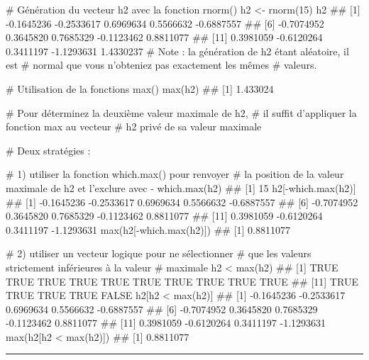 \documentclass[12pt,twosided, notitlepage]{book}
\newenvironment{Shaded}{}{}
\newcommand{\CommentTok}[1]{\textcolor[rgb]{0.00,0.50,0.00}{#1}}
\newcommand{\DecValTok}[1]{#1}
\newcommand{\KeywordTok}[1]{\textcolor[rgb]{0.00,0.00,1.00}{#1}}
\newcommand{\NormalTok}[1]{#1}
\newcommand{\OperatorTok}[1]{#1}
\newcommand{\StringTok}[1]{\textcolor[rgb]{0.00,0.50,0.50}{#1}}
\renewenvironment{Shaded}{\begin{snugshade}}{\end{snugshade}}
\begin{document}
\begin{enumerate}
\begin{Shaded}
\begin{Highlighting}[]
\CommentTok{# Génération du vecteur h2 avec la fonction rnorm()}
\NormalTok{h2 <-}\StringTok{ }\KeywordTok{rnorm}\NormalTok{(}\DecValTok{15}\NormalTok{)}
\NormalTok{h2}
\NormalTok{  ##  [1] -0.1645236 -0.2533617  0.6969634  0.5566632 -0.6887557}
\NormalTok{  ##  [6] -0.7074952  0.3645820  0.7685329 -0.1123462  0.8811077}
\NormalTok{  ## [11]  0.3981059 -0.6120264  0.3411197 -1.1293631  1.4330237}
\CommentTok{# Note : la génération de h2 étant aléatoire, il est}
\CommentTok{# normal que vous n'obteniez pas exactement les mêmes}
\CommentTok{# valeurs. }

\CommentTok{# Utilisation de la fonctions max()}
\KeywordTok{max}\NormalTok{(h2)}
\NormalTok{  ## [1] 1.433024}

\CommentTok{# Pour déterminez la deuxième valeur maximale de h2,}
\CommentTok{# il suffit d'appliquer la fonction max au vecteur}
\CommentTok{# h2 privé de sa valeur maximale}

\CommentTok{# Deux stratégies : }

\CommentTok{# 1) utiliser la fonction which.max() pour renvoyer }
\CommentTok{# la position de la valeur maximale de h2 et l'exclure avec -}
\KeywordTok{which.max}\NormalTok{(h2)}
\NormalTok{  ## [1] 15}
\NormalTok{h2[}\OperatorTok{-}\KeywordTok{which.max}\NormalTok{(h2)]}
\NormalTok{  ##  [1] -0.1645236 -0.2533617  0.6969634  0.5566632 -0.6887557}
\NormalTok{  ##  [6] -0.7074952  0.3645820  0.7685329 -0.1123462  0.8811077}
\NormalTok{  ## [11]  0.3981059 -0.6120264  0.3411197 -1.1293631}
\KeywordTok{max}\NormalTok{(h2[}\OperatorTok{-}\KeywordTok{which.max}\NormalTok{(h2)])}
\NormalTok{  ## [1] 0.8811077}

\CommentTok{# 2) utiliser un vecteur logique pour ne sélectionner }
\CommentTok{# que les valeurs strictement inférieures à la valeur }
\CommentTok{# maximale }
\NormalTok{h2 }\OperatorTok{<}\StringTok{ }\KeywordTok{max}\NormalTok{(h2)}
\NormalTok{  ##  [1]  TRUE  TRUE  TRUE  TRUE  TRUE  TRUE  TRUE  TRUE  TRUE  TRUE}
\NormalTok{  ## [11]  TRUE  TRUE  TRUE  TRUE FALSE}
\NormalTok{h2[h2 }\OperatorTok{<}\StringTok{ }\KeywordTok{max}\NormalTok{(h2)]}
\NormalTok{  ##  [1] -0.1645236 -0.2533617  0.6969634  0.5566632 -0.6887557}
\NormalTok{  ##  [6] -0.7074952  0.3645820  0.7685329 -0.1123462  0.8811077}
\NormalTok{  ## [11]  0.3981059 -0.6120264  0.3411197 -1.1293631}
\KeywordTok{max}\NormalTok{(h2[h2 }\OperatorTok{<}\StringTok{ }\KeywordTok{max}\NormalTok{(h2)])}
\NormalTok{  ## [1] 0.8811077}
\end{Highlighting}
\end{Shaded}

  \begin{center} \rule{0.5\linewidth}{\linethickness}\end{center} 
    \bigskip 
    \fi
\end{enumerate}
\end{document}
